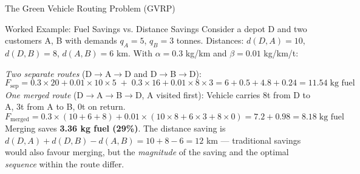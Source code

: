 \documentclass[aspectratio=169,10pt]{beamer}
\begin{document}
\begin{frame}[allowframebreaks]{The Green Vehicle Routing Problem (GVRP)}
  \begin{exampleblock}{Worked Example: Fuel Savings vs. Distance Savings}
    Consider a depot D and two customers A, B with demands $q_A=5$, $q_B=3$
    tonnes.  Distances: $d(D,A)=10$, $d(D,B)=8$, $d(A,B)=6$ km.
    With $\alpha=0.3$ kg/km and $\beta=0.01$ kg/km/t:

    \medskip
    \textit{Two separate routes} (D$\to$A$\to$D and D$\to$B$\to$D):
    \[
      F_{\text{sep}} = 0.3\times20 + 0.01\times10\times5 \;+\; 0.3\times16 + 0.01\times8\times3
      = 6+0.5+4.8+0.24 = 11.54\;\text{kg fuel}
    \]
    \textit{One merged route} (D$\to$A$\to$B$\to$D, A visited first):
    Vehicle carries 8t from D to A, 3t from A to B, 0t on return.
    \[
      F_{\text{merged}} = 0.3\times(10+6+8) + 0.01\times(10\times8 + 6\times3 + 8\times0)
      = 7.2 + 0.98 = 8.18\;\text{kg fuel}
    \]
    Merging saves \textbf{3.36 kg fuel (29\%)}.  The distance saving is
    $d(D,A)+d(D,B)-d(A,B)=10+8-6=12$ km --- traditional savings would also
    favour merging, but the \emph{magnitude} of the saving and the optimal
    \emph{sequence} within the route differ.
  \end{exampleblock}

\end{frame}
\end{document}

